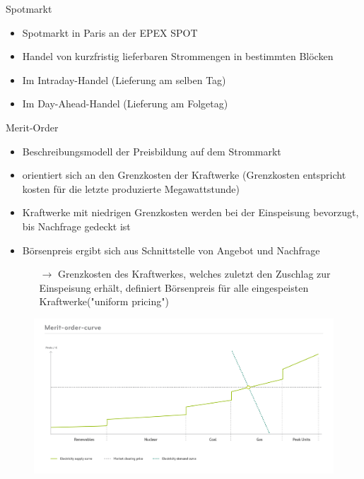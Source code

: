 \documentclass[aspectratio=1610, professionalfonts, 9pt]{beamer}
\begin{document}
\begin{frame}{Spotmarkt}
  \begin{itemize}
    \item Spotmarkt in Paris an der EPEX SPOT
    \item Handel von kurzfristig lieferbaren Strommengen in bestimmten Blöcken
    \item Im Intraday-Handel (Lieferung am selben Tag)
    \item Im Day-Ahead-Handel (Lieferung am Folgetag)
  \end{itemize}
\end{frame}

\begin{frame}{Merit-Order}
\begin{itemize}
  \item Beschreibungsmodell der Preisbildung auf dem Strommarkt
  \item orientiert sich an den Grenzkosten der Kraftwerke
  (Grenzkosten entspricht kosten für die letzte produzierte Megawattstunde)
\item Kraftwerke mit niedrigen Grenzkosten werden bei der
 Einspeisung bevorzugt, bis Nachfrage gedeckt ist
\item Börsenpreis ergibt sich aus Schnittstelle von Angebot und Nachfrage
\begin{itemize}
  \item[$\rightarrow$] Grenzkosten des Kraftwerkes, welches zuletzt den
  Zuschlag zur Einspeisung erhält, definiert Börsenpreis für alle eingespeisten Kraftwerke("uniform pricing")
\end{itemize}
\end{itemize}
\end{frame}

{
\begin{frame}
  \begin{figure}
  \includegraphics[width=1\textwidth]{images/Merit-order-curve-2.jpg}
\end{figure}
\end{frame}
}
\end{document}
